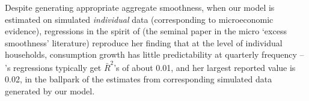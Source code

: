   Despite generating appropriate aggregate smoothness, when our model is estimated on simulated \emph{individual} data (corresponding to microeconomic evidence), regressions in the spirit of  \cite{dynanHabits} (the seminal paper in the micro `excess smoothness' literature) reproduce her finding that at the level of individual households, consumption growth has little predictability at quarterly frequency -- \cite{dynanHabits}'s regressions typically get $\bar{R}^{2}$'s %
  of about 0.01, and her largest reported value is 0.02, in the ballpark of the estimates from corresponding simulated data generated by our model.
